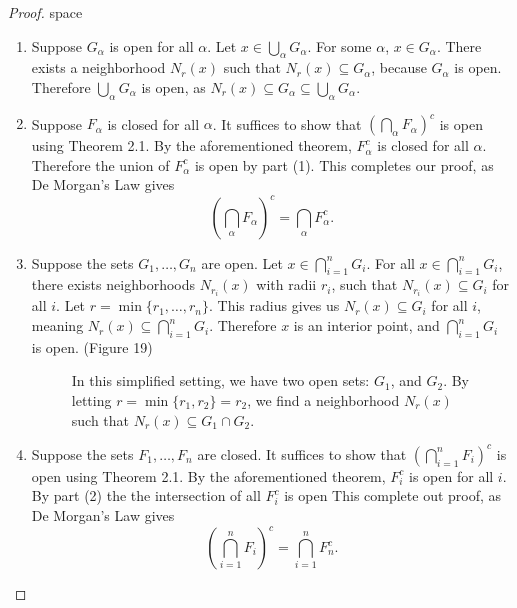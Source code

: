 \documentclass{article}
\theoremstyle{definition}
\begin{document}
	\begin{proof}{\color{white}space}
		\begin{enumerate}
			\item Suppose $ G_\alpha $ is open for all $ \alpha $. Let $ x\in \bigcup_\alpha G_\alpha $. For some $ \alpha $, $ x\in G_\alpha $. There exists a neighborhood $ N_r(x) $ such that $ N_r(x)\subseteq G_\alpha $, because $ G_\alpha $ is open. Therefore $ \bigcup_\alpha G_\alpha $ is open, as $ N_r(x)\subseteq G_\alpha\subseteq \bigcup_\alpha G_\alpha $. 
			\item Suppose $ F_\alpha $ is closed for all $ \alpha $. It suffices to show that $ (\bigcap_\alpha F_\alpha)^c $ is open using Theorem 2.1. By the aforementioned theorem, $ F_\alpha^c $ is closed for all $ \alpha $. Therefore the union of $ F_\alpha^c $ is open by part (1). This completes our proof, as De Morgan's Law gives $$ \left(\bigcap_\alpha F_\alpha\right)^c=\bigcap_\alpha F_\alpha^c.$$
			\item Suppose the sets $ G_1,\ldots,G_n $ are open. Let $ x\in \bigcap_{i=1}^n G_i$. For all $ x\in\bigcap_{i=1}^n G_i $, there exists neighborhoods $ N_{r_i}(x) $ with radii $ r_i $, such that $ N_{r_i}(x)\subseteq G_i $ for all $ i $. Let $ r=\min\{r_1,\ldots,r_n\} $. This radius gives us $ N_r(x)\subseteq G_i $ for all $ i $, meaning $ N_r(x)\subseteq \bigcap_{i=1}^n G_i $. Therefore $ x $ is an interior point, and $ \bigcap_{i=1}^n G_i $ is open. (Figure 19)   
			\begin{figure}[h!]
				\centering
				\caption{In this simplified setting, we have two open sets: $ G_1 $, and $ G_2 $. By letting $ r=\min\{r_1,r_2\}=r_2 $, we find a neighborhood $ N_r(x) $ such that $ N_r(x)\subseteq G_1\cap G_2 $. }
			\end{figure}
			\item  Suppose the sets $ F_1,\ldots,F_n $ are closed. It suffices to show that $ (\bigcap_{i=1}^n F_i)^c $ is open using Theorem 2.1. By the aforementioned theorem, $ F_i^c $ is open for all $ i$. By part (2) the the intersection of all $ F_i^c $ is open This complete out proof, as De Morgan's Law gives 
			$$ \left(\bigcap_{i=1}^n F_i\right)^c=\bigcap_{i=1}^n F_n^c.$$
		\end{enumerate}
	\end{proof}
\end{document}
